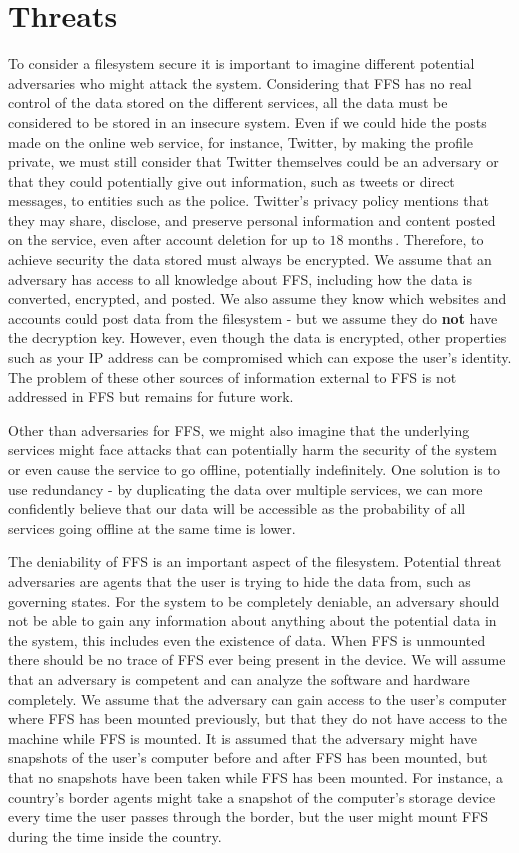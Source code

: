 \section{Threats}
To consider a filesystem secure it is important to imagine different potential adversaries who might attack the system. Considering that FFS has no real control of the data stored on the different services, all the data must be considered to be stored in an insecure system. Even if we could hide the posts made on the online web service, for instance, Twitter, by making the profile private, we must still consider that Twitter themselves could be an adversary or that they could potentially give out information, such as tweets or direct messages, to entities such as the police. Twitter's privacy policy mentions that they may share, disclose, and preserve personal information and content posted on the service, even after account deletion for up to $18$ months\,\cite{TwitterPrivacyPolicy}. Therefore, to achieve security the data stored must always be encrypted. We assume that an adversary has access to all knowledge about FFS, including how the data is converted, encrypted, and posted. We also assume they know which websites and accounts could post data from the filesystem - but we assume they do \textbf{not} have the decryption key. However, even though the data is encrypted, other properties such as your IP address can be compromised which can expose the user's identity. The problem of these other sources of information external to FFS is not addressed in FFS but remains for future work.

Other than adversaries for FFS, we might also imagine that the underlying services might face attacks that can potentially harm the security of the system or even cause the service to go offline, potentially indefinitely. One solution is to use redundancy - by duplicating the data over multiple services, we can more confidently believe that our data will be accessible as the probability of all services going offline at the same time is lower.

The deniability of FFS is an important aspect of the filesystem. Potential threat adversaries are agents that the user is trying to hide the data from, such as governing states. For the system to be completely deniable, an adversary should not be able to gain any information about anything about the potential data in the system, this includes even the existence of data. When FFS is unmounted there should be no trace of FFS ever being present in the device. We will assume that an adversary is competent and can analyze the software and hardware completely. We assume that the adversary can gain access to the user's computer where FFS has been mounted previously, but that they do not have access to the machine while FFS is mounted. It is assumed that the adversary might have snapshots of the user's computer before and after FFS has been mounted, but that no snapshots have been taken while FFS has been mounted. For instance, a country's border agents might take a snapshot of the computer's storage device every time the user passes through the border, but the user might mount FFS during the time inside the country.